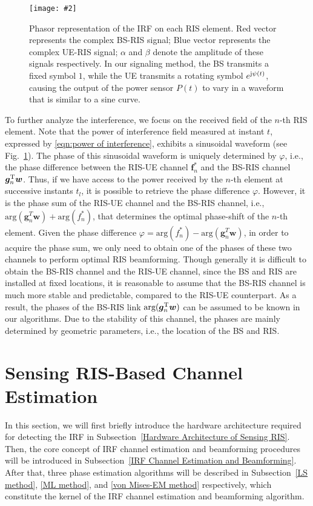 \documentclass[12pt,draftclsnofoot,journal,onecolumn]{IEEEtran}
\theoremstyle{nonumberplain}
\def \arg {\text{arg}}
\newcommand{\myincludegraphics}[2][width=12cm]{\texttt{[image: \#2]}}
\begin{document}
    \begin{figure}[htbp]
        \centering
        \myincludegraphics{figures/phasor.pdf}
        \caption{Phasor representation of the \ac{IRF} on each RIS element. Red vector represents the complex BS-RIS signal; Blue vector represents the complex UE-RIS signal; $\alpha$ and $\beta$ denote the amplitude of these signals respectively. In our signaling method, the BS transmits a fixed symbol $1$, while the UE transmits a rotating symbol $e^{{\rm j}\psi(t)}$, causing the output of the power sensor $P(t)$ to vary in a waveform that is similar to a sine curve.}
        \label{fig:phasor}
    \end{figure}
    To further analyze the interference, we focus on the received field of the $n$-th RIS element. Note that the power of interference field measured at instant $t$, expressed by \eqref{eqn:power of interference}, exhibits a sinusoidal waveform (see Fig.~\ref{fig:phasor}). The phase of this sinusoidal waveform is uniquely determined by $\varphi$, i.e., the phase difference between the RIS-UE channel ${\bm f}_n^{*}$ and the BS-RIS channel ${\bm g}_n^{\rm T}{\bm w}$. Thus, if we have access to the power received by the $n$-th element at successive instants $t_l$, it is possible to retrieve the phase difference $\varphi$. However, it is the phase sum of the RIS-UE channel and the BS-RIS channel, i.e., $\arg({\bm g}_n^{T}{\bm w})+\arg(f_n^*)$, that determines the optimal phase-shift of the $n$-th element. Given the phase difference $\varphi = \arg\left(f_{n}^{*}\right)-\arg\left(\bm g_{n}^{T}\bm w\right)$, in order to acquire the phase sum, we only need to obtain one of the phases of these two channels to perform optimal RIS beamforming. Though generally it is difficult to obtain the BS-RIS channel and the RIS-UE channel, since the BS and RIS are installed at fixed locations, it is reasonable to assume that the BS-RIS channel is much more stable and predictable, compared to the RIS-UE counterpart. As a result, the phases of the BS-RIS link $\arg({\bm g}_n^{\rm T}{\bm w})$ can be assumed to be known in our algorithms. Due to the stability of this channel, the phases are mainly determined by geometric parameters, i.e., the location of the BS and RIS. 

    

\section{Sensing RIS-Based Channel Estimation}
\label{Sensing RIS-Based Channel Estimation}
In this section, we will first briefly introduce the hardware architecture required for detecting the \ac{IRF} in Subsection~\ref{Hardware Architecture of Sensing RIS}. Then, the core concept of IRF channel estimation and beamforming procedures will be introduced in Subsection~\ref{IRF Channel Estimation and Beamforming}. After that, three phase estimation algorithms will be described in Subsection~\ref{LS method}, \ref{ML method}, and \ref{von Mises-EM method} respectively, which constitute the kernel of the \ac{IRF} channel estimation and beamforming algorithm. 
\end{document}
